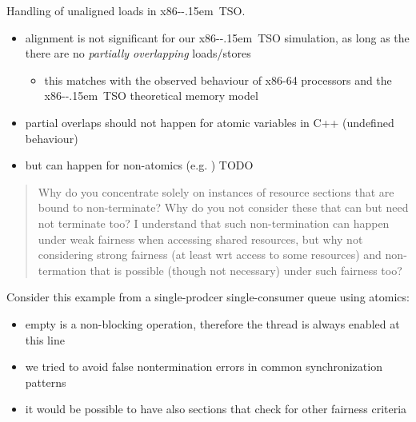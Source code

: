 \documentclass[aspectratio=169, fi]{paradise-slide}
\newcommand{\xtso}{\mbox{x86-\kern-.15em TSO}\xspace}
\newcommand{\rquote}[1]{\begin{quote}#1\end{quote}\bigskip\setlength{\leftmargini}{1em}}
\begin{document}
\begin{frame}[noframenumbering]{\qtitle}
  Handling of unaligned loads in \xtso.\bigskip

  \begin{itemize}
    \item alignment is not significant for our \xtso simulation, as long as the there are no
      \emph{partially overlapping} loads/stores
      \begin{itemize}
        \item this matches with the observed behaviour of x86-64 processors and the \xtso
          theoretical memory model
      \end{itemize}
    \item partial overlaps should not happen for atomic variables in C++ (undefined behaviour)
    \item but can happen for non-atomics (e.g. ) TODO
  \end{itemize}
\end{frame}

\begin{frame}{\qtitle}
  \rquote{Why do you concentrate solely on instances of resource sections that are bound to
    non-terminate? Why do you not consider these that can but need not terminate too? I understand
    that such non-termination can happen under weak fairness when accessing shared resources, but
    why not considering strong fairness (at least wrt access to some resources) and non-termation
    that is possible (though not necessary) under such fairness too?}

  Consider this example from a single-prodcer single-consumer queue using atomics:
  \begin{cppcode}
    T &front() {
        while ( empty() ) { /* wait */ }
        // ...
  \end{cppcode}
  \begin{itemize}
    \item empty is a non-blocking operation, therefore the thread is always enabled at this line
    \item we tried to avoid false nontermination errors in common synchronization patterns
    \item it would be possible to have also sections that check for other fairness criteria
  \end{itemize}
\end{frame}
\end{document}
